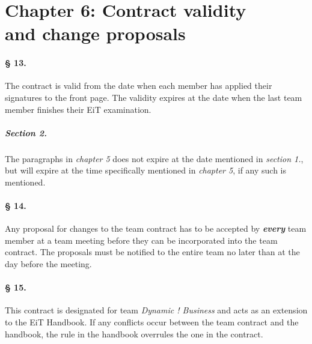 \section*{Chapter 6: Contract validity \\ and change proposals}
\paragraph{§ 13.}
The contract is valid from the date when each member has applied their signatures to the front page. The validity expires at the date when the last team member finishes their EiT examination.
\subparagraph{Section 2.}
The paragraphs in \textit{chapter 5} does not expire at the date mentioned in \textit{section 1.}, but will expire at the time specifically mentioned in \emph{chapter 5}, if any such is mentioned.
\paragraph{§ 14.} \label{Change}
Any proposal for changes to the team contract has to be accepted by \textbf{\textit{every}} team member at a team meeting before they can be incorporated into the team contract. The proposals must be notified to the entire team no later than at the day before the meeting.
\paragraph{§ 15.}
This contract is designated for team \emph{Dynamic ! Business} and acts as an extension to the EiT Handbook. If any conflicts occur between the team contract and the handbook, the rule in the handbook overrules the one in the contract.

